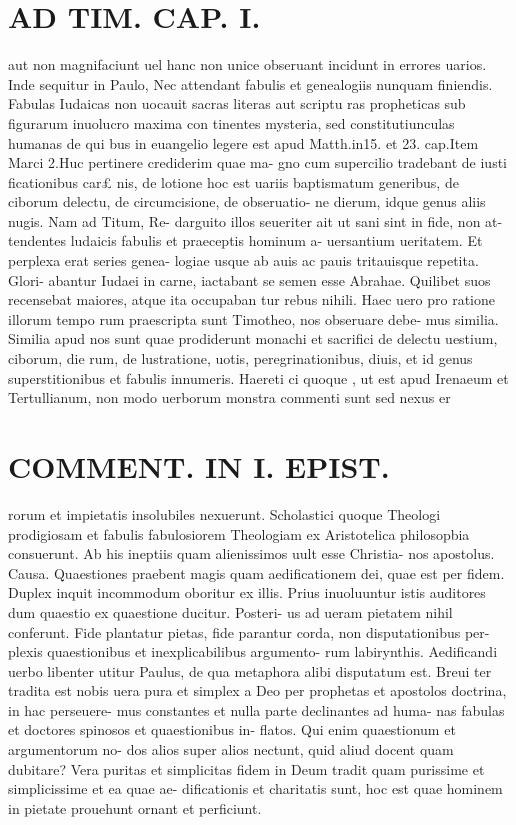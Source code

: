 \documentclass{article}
\begin{document}
\begin{pages}
\section*{AD TIM. CAP. I. }
\marginpar{[ p.96 ]}\pstart aut non magnifaciunt uel hanc non unice obseruant incidunt in errores uarios. Inde sequitur in Paulo, Nec attendant fabulis et genealogiis nunquam finiendis. Fabulas Iudaicas non uocauit sacras literas aut scriptu ras propheticas sub figurarum inuolucro maxima con tinentes mysteria, sed constitutiunculas humanas de qui bus in euangelio legere est apud Matth.in15. et 23. cap.Item Marci 2.Huc pertinere crediderim quae ma- gno cum supercilio tradebant de iusti ficationibus car£ nis, de lotione hoc est uariis baptismatum generibus, de ciborum delectu, de circumcisione, de obseruatio- ne dierum, idque genus aliis nugis. Nam ad Titum, Re- darguito illos seueriter ait ut sani sint in fide, non at- tendentes ludaicis fabulis et praeceptis hominum a- uersantium ueritatem. Et perplexa erat series genea- logiae usque ab auis ac pauis tritauisque repetita. Glori- abantur Iudaei in carne, iactabant se semen esse Abrahae. Quilibet suos recensebat maiores, atque ita occupaban tur rebus nihili. Haec uero pro ratione illorum tempo rum praescripta sunt Timotheo, nos obseruare debe- mus similia. Similia apud nos sunt quae prodiderunt monachi et sacrifici de delectu uestium, ciborum, die rum, de lustratione, uotis, peregrinationibus, diuis, et id genus superstitionibus et fabulis innumeris. Haereti ci quoque , ut est apud Irenaeum et Tertullianum, non modo uerborum monstra commenti sunt sed nexus er  \pend
\section*{COMMENT. IN I. EPIST. }\pstart rorum et impietatis insolubiles nexuerunt. Scholastici quoque Theologi prodigiosam et fabulis fabulosiorem Theologiam ex Aristotelica philosopbia consuerunt. Ab his ineptiis quam alienissimos uult esse Christia- nos apostolus. Causa. Quaestiones praebent magis quam aedificationem dei, quae est per fidem. Duplex inquit incommodum oboritur ex illis. Prius inuoluuntur istis auditores dum quaestio ex quaestione ducitur. Posteri- us ad ueram pietatem nihil conferunt. Fide plantatur pietas, fide parantur corda, non disputationibus per- plexis quaestionibus et inexplicabilibus argumento- rum labirynthis. Aedificandi uerbo libenter utitur Paulus, de qua metaphora alibi disputatum est. Breui ter tradita est nobis uera pura et simplex a Deo per prophetas et apostolos doctrina, in hac perseuere- mus constantes et nulla parte declinantes ad huma- nas fabulas et doctores spinosos et quaestionibus in- flatos. Qui enim quaestionum et argumentorum no- dos alios super alios nectunt, quid aliud docent quam dubitare? Vera puritas et simplicitas fidem in Deum tradit quam purissime et simplicissime et ea quae ae- dificationis et charitatis sunt, hoc est quae hominem in pietate prouehunt ornant et perficiunt.  \pend
{}
{}

\end{pages}
\end{document}
